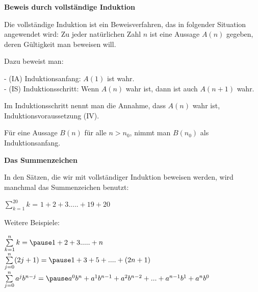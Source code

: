\begin{frame}[fragile]

\textbf{Beweis durch vollständige Induktion}

 Die vollständige Induktion ist ein Beweisverfahren, das in folgender Situation angewendet wird: 
 Zu jeder natürlichen Zahl $n$ ist eine Aussage
$A(n)$ gegeben, deren Gültigkeit man beweisen will. \pause

Dazu beweist man:

- (IA) Induktionsanfang: $A(1)$ ist wahr. \\ \pause
- (IS) Induktionsschritt: Wenn $A(n)$ wahr ist, dann ist auch $A(n+1)$ wahr. \pause

Im Induktionsschritt nennt man die Annahme, dass $A(n)$ wahr ist, Induktionsvoraussetzung (IV). \pause

Für eine Aussage $B(n)$ für alle $n > n_0$, nimmt man $B(n_0)$ als Induktionsanfang.

\end{frame}


\begin{frame}[fragile]

\textbf{Das Summenzeichen}

In den Sätzen, die wir mit vollständiger Induktion beweisen werden, wird manchmal das Summenzeichen benutzt:

$\sum\limits_{k=1}^{20}k$ \pause =  $1 + 2 + 3 ..... + 19 + 20$  \pause
 

Weitere Beispiele:

$\sum\limits_{k=1}^{n}k = \pause 1 + 2 + 3 ..... + n$  \\ 

$\sum\limits_{j=0}^n (2j+1) = \pause 1 + 3+ 5 + .... + (2n+1)$\\

$\sum\limits_{j=0}^n a^j b^{n-j} = \pause a^0b^n+a^1b^{n-1}+a^2b^{n-2} + ... + a^{n-1}b^1+a^nb^0$
\end{frame}


